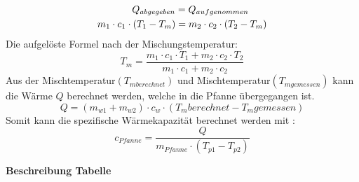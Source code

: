 \documentclass{article}
\begin{document}
\begin{equation}
\begin{split}
 Q_{abgegeben} = Q_{aufgenommen}\hspace{0.655cm}\\
 m_1\cdot c_1\cdot (T_1-T_m)=m_2\cdot c_2\cdot (T_2-T_m)
\end{split}
\end{equation}
Die aufgelöste Formel nach der Mischungstemperatur:
\begin{equation}
	T_m = \frac{m_1\cdot c_1\cdot T_1+m_2\cdot c_2\cdot T_2}{m_1\cdot c_1+m_2\cdot c_2}
\end{equation}
Aus der Mischtemperatur$(T_{mberechnet})$ und Mischtemperatur$(T_{mgemessen})$ kann die Wärme $Q$ berechnet werden, welche in die Pfanne übergegangen ist.
\begin{equation}
 Q = (m_{w1}+m_{w2}) \cdot c_w \cdot (T_m{berechnet}-T_m{gemessen})
\end{equation}
Somit kann die spezifische Wärmekapazität berechnet werden mit :
\begin{equation}
	c_{Pfanne} = \frac{Q}{m_{Pfanne} \cdot (T_{p1}-T_{p2}) }
\end{equation}


\newpage
\textbf{Beschreibung Tabelle}
\end{document}
